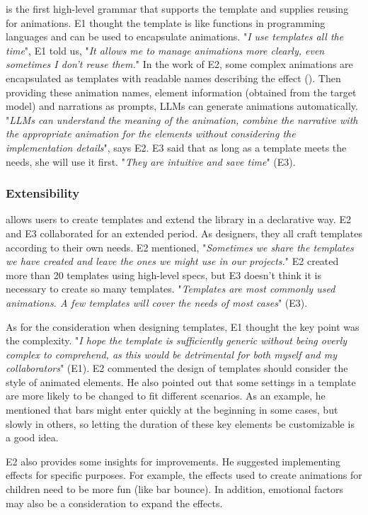 \gaia{} is the first high-level grammar that supports the template and supplies reusing for animations.
E1 thought the template is like functions in programming languages and can be used to encapsulate animations.
"\textit{I use templates all the time}", E1 told us, "\textit{It allows me to manage animations more clearly, even sometimes I don't reuse them.}"
In the work of E2, some complex animations are encapsulated as templates with readable names describing the effect (\eg {}).
Then providing these animation names, element information (obtained from the target model) and narrations as prompts, LLMs can generate animations automatically.
"\textit{LLMs can understand the meaning of the animation, combine the narrative with the appropriate animation for the elements without considering the implementation details}", says E2.
E3 said that as long as a template meets the needs, she will use it first.
"\textit{They are intuitive and save time}" (E3).


\subsubsection{Extensibility}

\gaia{} allows users to create templates and extend the library in a declarative way.
E2 and E3 collaborated for an extended period.
As designers, they all craft templates according to their own needs.
E2 mentioned, "\textit{Sometimes we share the templates we have created and leave the ones we might use in our projects.}"
E2 created more than 20 templates using high-level specs, but E3 doesn't think it is necessary to create so many templates.
"\textit{Templates are most commonly used animations. A few templates will cover the needs of most cases}" (E3).

As for the consideration when designing templates, E1 thought the key point was the complexity.
"\textit{I hope the template is sufficiently generic without being overly complex to comprehend, as this would be detrimental for both myself and my collaborators}" (E1).
E2 commented the design of templates should consider the style of animated elements.
He also pointed out that some settings in a template are more likely to be changed to fit different scenarios.
As an example, he mentioned that bars might enter quickly at the beginning in some cases, but slowly in others, so letting the duration of these key elements be customizable is a good idea.

E2 also provides some insights for \gaia{} improvements. He suggested implementing effects for specific purposes.
For example, the effects used to create animations for children need to be more fun (like bar bounce).
In addition, emotional factors may also be a consideration to expand the effects.
